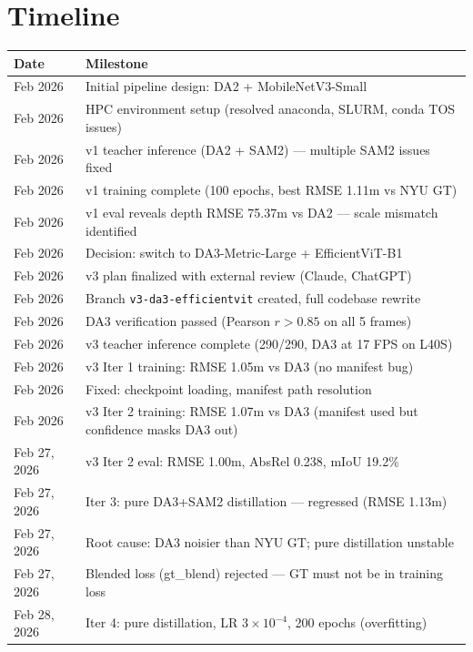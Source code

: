 \documentclass[11pt,a4paper]{article}
\begin{document}
\section{Timeline}

\begin{longtable}{lp{10cm}}
\toprule
\textbf{Date} & \textbf{Milestone} \\
\midrule
\endfirsthead
Feb 2026 & Initial pipeline design: DA2 + MobileNetV3-Small \\
Feb 2026 & HPC environment setup (resolved anaconda, SLURM, conda TOS issues) \\
Feb 2026 & v1 teacher inference (DA2 + SAM2) --- multiple SAM2 issues fixed \\
Feb 2026 & v1 training complete (100 epochs, best RMSE 1.11m vs NYU GT) \\
Feb 2026 & v1 eval reveals depth RMSE 75.37m vs DA2 --- scale mismatch identified \\
Feb 2026 & Decision: switch to DA3-Metric-Large + EfficientViT-B1 \\
Feb 2026 & v3 plan finalized with external review (Claude, ChatGPT) \\
Feb 2026 & Branch \texttt{v3-da3-efficientvit} created, full codebase rewrite \\
Feb 2026 & DA3 verification passed (Pearson $r > 0.85$ on all 5 frames) \\
Feb 2026 & v3 teacher inference complete (290/290, DA3 at 17 FPS on L40S) \\
Feb 2026 & v3 Iter 1 training: RMSE 1.05m vs DA3 (no manifest bug) \\
Feb 2026 & Fixed: checkpoint loading, manifest path resolution \\
Feb 2026 & v3 Iter 2 training: RMSE 1.07m vs DA3 (manifest used but confidence masks DA3 out) \\
Feb 27, 2026 & v3 Iter 2 eval: RMSE 1.00m, AbsRel 0.238, mIoU 19.2\% \\
Feb 27, 2026 & Iter 3: pure DA3+SAM2 distillation --- regressed (RMSE 1.13m) \\
Feb 27, 2026 & Root cause: DA3 noisier than NYU GT; pure distillation unstable \\
Feb 27, 2026 & Blended loss (gt\_blend) rejected --- GT must not be in training loss \\
Feb 28, 2026 & Iter 4: pure distillation, LR $3 \times 10^{-4}$, 200 epochs (overfitting) \\

\end{longtable}
\end{document}
